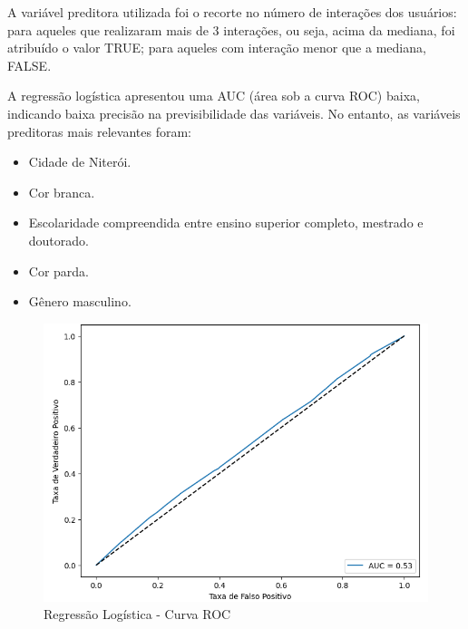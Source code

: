 A variável preditora utilizada foi o recorte no número de interações dos usuários: para aqueles que realizaram mais de 3 interações, ou seja, acima da mediana, foi atribuído o valor TRUE; para aqueles com interação menor que a mediana, FALSE.

A regressão logística apresentou uma AUC (área sob a curva ROC) baixa, indicando baixa precisão na previsibilidade das variáveis. No entanto, as variáveis preditoras mais relevantes foram:

\begin{itemize}
	\item Cidade de Niterói.
	\item Cor branca.
	\item Escolaridade compreendida entre ensino superior completo, mestrado e doutorado.
	\item Cor parda.
	\item Gênero masculino.
\end{itemize}

\begin{figure}[!htb]
	\caption{Regressão Logística - Curva ROC}
	\label{fig:regression_roc}
	\centering
	\includegraphics[scale=0.8]{images/regression_roc.png}
\end{figure}